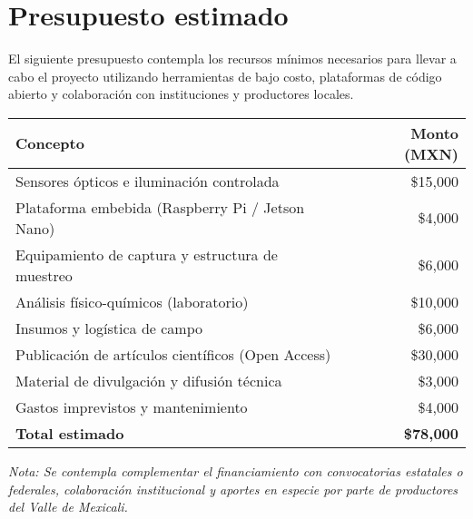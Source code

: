 
\section{Presupuesto estimado}

El siguiente presupuesto contempla los recursos mínimos necesarios para llevar a cabo el proyecto utilizando herramientas de bajo costo, plataformas de código abierto y colaboración con instituciones y productores locales.

\begin{center}
\begin{tabular}{|p{10cm}|r|}
\hline
\textbf{Concepto} & \textbf{Monto (MXN)} \\
\hline
Sensores ópticos e iluminación controlada & \$15,000 \\
Plataforma embebida (Raspberry Pi / Jetson Nano) & \$4,000 \\
Equipamiento de captura y estructura de muestreo & \$6,000 \\
Análisis físico-químicos (laboratorio) & \$10,000 \\
Insumos y logística de campo & \$6,000 \\
Publicación de artículos científicos (Open Access) & \$30,000 \\
Material de divulgación y difusión técnica & \$3,000 \\
Gastos imprevistos y mantenimiento & \$4,000 \\
\hline
\textbf{Total estimado} & \textbf{\$78,000} \\
\hline
\end{tabular}
\end{center}

\textit{Nota: Se contempla complementar el financiamiento con convocatorias estatales o federales, colaboración institucional y aportes en especie por parte de productores del Valle de Mexicali.}
